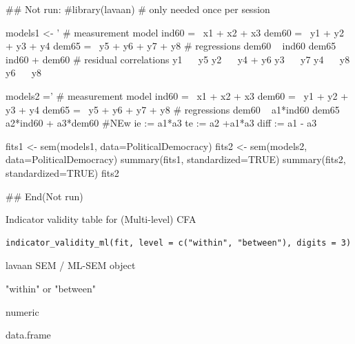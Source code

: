 \documentclass[a4paper]{book}
\begin{document}
\begin{Examples}
\begin{ExampleCode}

## Not run: 
#library(lavaan) # only needed once per session

models1 <- '
  # measurement model
    ind60 =~ x1 + x2 + x3
    dem60 =~ y1 + y2 + y3 + y4
    dem65 =~ y5 + y6 + y7 + y8
    # regressions
    dem60 ~ ind60
    dem65 ~ ind60 + dem60
      # residual correlations
    y1 ~~ y5
    y2 ~~ y4 + y6
    y3 ~~ y7
    y4 ~~ y8
    y6 ~~ y8

models2 ='
  # measurement model
    ind60 =~ x1 + x2 + x3
    dem60 =~ y1 + y2 + y3 + y4
    dem65 =~ y5 + y6 + y7 + y8
     # regressions
    dem60 ~ a1*ind60
    dem65 ~ a2*ind60 + a3*dem60
 #NEw
   ie := a1*a3
   te := a2 +a1*a3
   diff := a1 - a3




fits1 <- sem(models1, data=PoliticalDemocracy)
fits2 <- sem(models2, data=PoliticalDemocracy)
summary(fits1, standardized=TRUE)
summary(fits2, standardized=TRUE)
fits2 %

## End(Not run)

\end{ExampleCode}
\end{Examples}
%
\begin{Description}
Indicator validity table for (Multi-level) CFA
\end{Description}
%
\begin{Usage}
\begin{verbatim}
indicator_validity_ml(fit, level = c("within", "between"), digits = 3)
\end{verbatim}
\end{Usage}
%
\begin{Arguments}
\begin{ldescription}
\item[\code{fit}] lavaan SEM / ML-SEM object

\item[\code{level}] "within" or "between"

\item[\code{digits}] numeric
\end{ldescription}
\end{Arguments}
%
\begin{Value}
data.frame
\end{Value}
\end{document}
